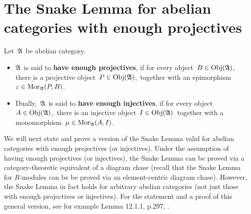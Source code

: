 

\section{The Snake Lemma for abelian categories with enough projectives}
\setcounter{theorem}{0}
\setcounter{equation}{0}


\renewcommand{\theenumi}{\roman{enumi}}
\renewcommand{\labelenumi}{\textnormal{(\theenumi)}$\;\;$}


\begin{definition}
\mbox{}
\vskip 0.1cm
\noindent
Let \,$\mathfrak{A}$\, be abelian category.
\begin{itemize}
\item
	$\mathfrak{A}$\, is said to \textbf{have enough projectives},
	if for every object \,$B \in \textnormal{Obj}(\mathfrak{A})$,\,
	there is a projective object \,$P \in \textnormal{Obj}(\mathfrak{A})$,\,
	together with an epimorphism \,$\varepsilon \in \textnormal{Mor}_{\mathfrak{A}}(P,B)$.
\item	
	Dually, \,$\mathfrak{A}$\, is said to \textbf{have enough injectives},
	if for every object \,$A \in \textnormal{Obj}(\mathfrak{A})$,\,
	there is an injective object \,$I \in \textnormal{Obj}(\mathfrak{A})$\,
	together with a monomorphism \,$\mu \in \textnormal{Mor}_{\mathfrak{A}}(A,I)$.
\end{itemize}
\end{definition}

\vskip 0.5cm


\begin{remark}
\mbox{}
\vskip 0.05cm
\noindent
We will next state and prove a version of the Snake Lemma
valid for abelian categories with enough projectives (or injectives).
Under the assumption of having enough projectives (or injectives),
the Snake Lemma can be proved via a category-theoretic equivalent
of a diagram chase
(recall that the Snake Lemma for $R$-modules can be be proved via an element-centric diagram chase). 
However, the Snake Lemma in fact holds for arbitrary abelian categories
(not just those with enough projectives or injectives).
For the statement and a proof of this general version, see for example
Lemma 12.1.1, p.297, \cite{kashiwara2005categories}.
\end{remark}

